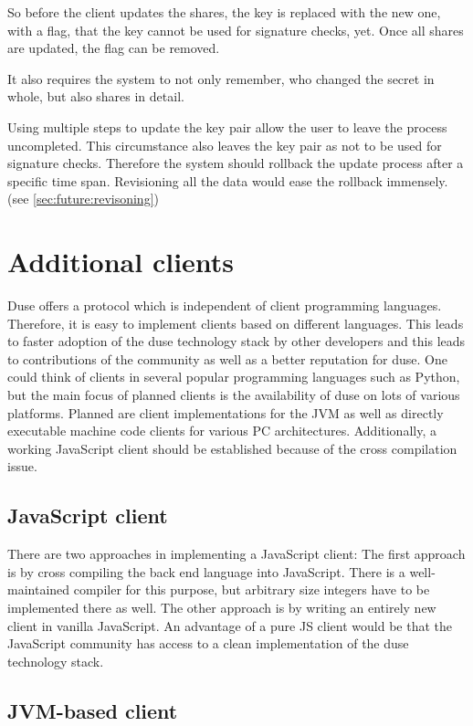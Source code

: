 So before the client updates the shares, the key is replaced with the new one,
with a flag, that the key cannot be used for signature checks, yet. Once all
shares are updated, the flag can be removed.

It also requires the system to not only remember, who changed the secret in
whole, but also shares in detail.

Using multiple steps to update the key pair allow the user to leave the process
uncompleted. This circumstance also leaves the key pair as not to be used for
signature checks. Therefore the system should rollback the update process after
a specific time span. Revisioning all the data would ease the rollback
immensely. (see \ref{sec:future:revisoning})

\section{Additional clients}

Duse offers a protocol which is independent of client programming languages.
Therefore, it is easy to implement clients based on different
languages. This leads to faster adoption of the duse technology stack by
other developers and this leads to contributions of the community as well
as a better reputation for duse. One could think of clients in several
popular programming languages such as Python, but the main focus of planned
clients is the availability of duse on lots of various platforms.
Planned are client implementations for the JVM as well as directly executable
machine code clients for various PC architectures. Additionally, a working
JavaScript client should be established because of the cross compilation issue.

\subsection{JavaScript client}

There are two approaches in implementing a JavaScript client: The first
approach is by cross compiling the back end language into JavaScript. There
is a well-maintained compiler for this purpose, but arbitrary size integers
have to be implemented there as well. The other approach is by writing
an entirely new client in vanilla JavaScript. An advantage of a pure JS
client would be that the JavaScript community has access to a clean
implementation of the duse technology stack.

\subsection{JVM-based client}


